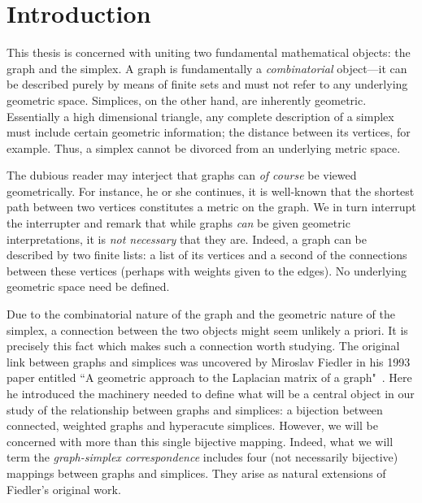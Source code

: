 \chapter{Introduction}
\label{chap:intro}



This thesis is concerned with uniting two fundamental mathematical objects: the graph and the simplex. A graph is fundamentally a  \emph{combinatorial} object---it can be described purely by means of finite sets and must not refer to any underlying geometric space.  
Simplices, on  the other hand, are inherently  geometric. 
Essentially a high dimensional triangle, any complete description of a simplex must include certain geometric information; the distance between its vertices, for example. Thus, a simplex cannot be divorced from an  underlying metric space. 

The dubious reader may interject that graphs can \emph{of course} be viewed geometrically. For instance, he or she continues, it  is well-known that the shortest path between two vertices constitutes  a metric on  the graph. We in turn interrupt the interrupter and remark that while graphs \emph{can} be  given  geometric interpretations, it is \emph{not necessary} that  they are. Indeed, a graph can  be described by two finite lists: a list of its vertices and a second of the connections between these vertices (perhaps with  weights  given  to the  edges). No underlying geometric space need be defined. 

Due  to the combinatorial  nature of the graph and the geometric nature of the simplex, a connection between the two objects might seem unlikely a  priori. It is precisely this fact which makes such a connection worth studying. 
The original  link  between graphs and simplices was uncovered by 
Miroslav Fiedler  in his 1993 paper entitled ``A geometric approach to the Laplacian matrix of a graph"~\cite{fiedler1993geometric}. 
Here he introduced the machinery needed  to define what will  be  a central object in our study of the relationship between graphs  and simplices: a bijection between connected, weighted graphs and hyperacute simplices.
However, we will be concerned with more than this single bijective mapping. Indeed, what we will term the \emph{graph-simplex correspondence} includes four (not necessarily bijective) mappings between graphs and simplices. They arise as natural extensions  of  Fiedler's original work. 

